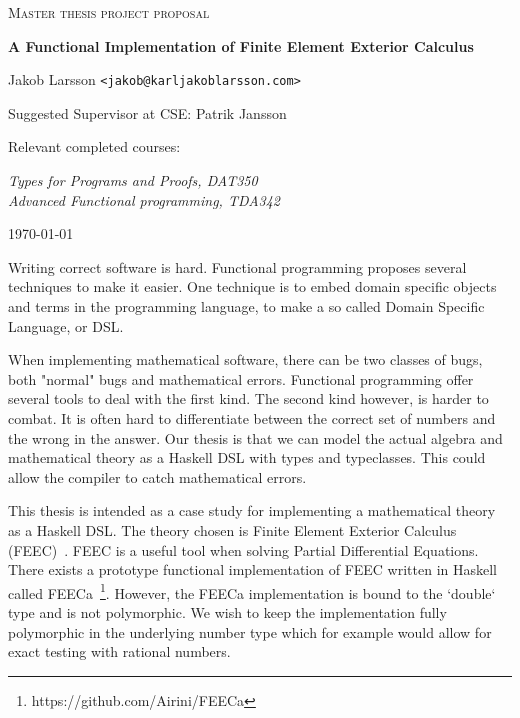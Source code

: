\documentclass{scrartcl}
\begin{document}
\begin{titlepage}

\centering
{\scshape\LARGE Master thesis project proposal}

\vspace{0.5cm}
{\huge\bfseries A Functional Implementation of Finite Element Exterior Calculus}

\vspace{2cm}
{\Large Jakob Larsson \texttt{<jakob@karljakoblarsson.com>}}

\vspace{1.0cm}
{\large Suggested Supervisor at CSE: Patrik Jansson }

\vspace{1.5cm}
{\large Relevant completed courses:}

{\itshape
Types for Programs and Proofs, DAT350 \\
Advanced Functional programming, TDA342 \\
}

\vfill
{\large \today}

\end{titlepage}


%
%


Writing correct software is hard.  Functional programming proposes several
techniques to make it easier.  One technique is to embed domain specific
objects and terms in the programming language, to make a so called Domain
Specific Language, or DSL.~\cite{van2000domain}


When implementing mathematical software, there can be two classes of bugs, both
"normal" bugs and mathematical errors. Functional programming offer several
tools to deal with the first kind. The second kind however, is harder to
combat. It is often hard to differentiate between the correct set of numbers
and the wrong in the answer. Our thesis is that we can model the actual algebra
and mathematical theory as a Haskell DSL with types and typeclasses. This
could allow the compiler to catch mathematical errors.


This thesis is intended as a case study for implementing a mathematical theory
as a Haskell DSL. The theory chosen is Finite Element Exterior Calculus
(FEEC)~\cite{arnold2006finite}. FEEC is a useful tool when solving Partial
Differential Equations.  There exists a prototype functional implementation of
FEEC written in Haskell called
FEECa~\footnote{https://github.com/Airini/FEECa}. However, the FEECa
implementation is bound to the `double` type and is not polymorphic. We wish to
keep the implementation fully polymorphic in the underlying number type which
for example would allow for exact testing with rational numbers.
\end{document}
